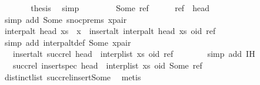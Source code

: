 \begin{isabellebody}
\ \ \ \ \isamarkupfalse%
\ \isamarkupfalse%
\ {\isacharquery}thesis\ \isamarkupfalse%
\ simp\isanewline
\ \ \isamarkupfalse%
\isanewline
\ \ \ \ \isamarkupfalse%
\ {\isacharparenleft}Some\ ref{\isacharparenright}\isanewline
\ \ \ \ \isamarkupfalse%
\ {\isachardoublequoteopen}ref\ {\isasymnoteq}\ head{\isachardoublequoteclose}\isanewline
\ \ \ \ \ \ \isamarkupfalse%
\ {\isacharparenleft}simp\ add{\isacharcolon}\ Some\ snoc{\isachardot}prems{\isacharparenleft}{}{\isacharparenright}\ x{\isacharunderscore}pair{\isacharparenright}\isanewline
\ \ \ \ \isamarkupfalse%
\ {\isachardoublequoteopen}interp{\isacharunderscore}alt\ head\ {\isacharparenleft}xs\ {\isacharat}\ {\isacharbrackleft}x{\isacharbrackright}{\isacharparenright}\ {\isacharequal}\ insert{\isacharunderscore}alt\ {\isacharparenleft}interp{\isacharunderscore}alt\ head\ xs{\isacharparenright}\ {\isacharparenleft}oid{\isacharcomma}\ ref{\isacharparenright}{\isachardoublequoteclose}\isanewline
\ \ \ \ \ \ \isamarkupfalse%
\ {\isacharparenleft}simp\ add{\isacharcolon}\ interp{\isacharunderscore}alt{\isacharunderscore}def\ Some\ x{\isacharunderscore}pair{\isacharparenright}\isanewline
\ \ \ \ \isamarkupfalse%
\ \isamarkupfalse%
\ {\isachardoublequoteopen}{\isachardot}{\isachardot}{\isachardot}\ {\isacharequal}\ insert{\isacharunderscore}alt\ {\isacharparenleft}succ{\isacharunderscore}rel\ {\isacharparenleft}head\ {\isacharhash}\ interp{\isacharunderscore}list\ xs{\isacharparenright}{\isacharparenright}\ {\isacharparenleft}oid{\isacharcomma}\ ref{\isacharparenright}{\isachardoublequoteclose}\isanewline
\ \ \ \ \ \ \isamarkupfalse%
\ {\isacharparenleft}simp\ add{\isacharcolon}\ IH{\isacharparenright}\isanewline
\ \ \ \ \isamarkupfalse%
\ \isamarkupfalse%
\ {\isachardoublequoteopen}{\isachardot}{\isachardot}{\isachardot}\ {\isacharequal}\ succ{\isacharunderscore}rel\ {\isacharparenleft}insert{\isacharunderscore}spec\ {\isacharparenleft}head\ {\isacharhash}\ interp{\isacharunderscore}list\ xs{\isacharparenright}\ {\isacharparenleft}oid{\isacharcomma}\ Some\ ref{\isacharparenright}{\isacharparenright}{\isachardoublequoteclose}\isanewline
\ \ \ \ \ \ \isamarkupfalse%
\ distinct{\isacharunderscore}list\ succ{\isacharunderscore}rel{\isacharunderscore}insert{\isacharunderscore}Some\ \isamarkupfalse%
\ metis\isanewline
\ \ \ \ \isamarkupfalse%

\end{isabellebody}

